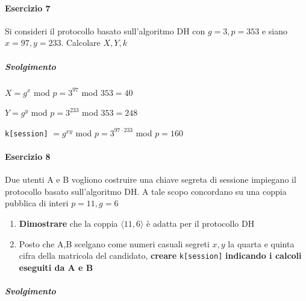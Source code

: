 \documentclass[10pt]{book}
\begin{document}
\paragraph{Esercizio 7} Si consideri il protocollo basato sull'algoritmo DH con $g=3, p=353$ e siano $x=97,y=233$. Calcolare $X,Y,k$
\subparagraph{Svolgimento}
\begin{list}{}{}
	\item $X = g^x$ mod $p = 3^{97}$ mod $353 = 40$
	\item $Y = g^y$ mod $p = 3^{233}$ mod $353 = 248$
	\item \texttt{k[session]} $= g^{xy}$ mod $p = 3^{97\cdot233}$ mod $p = 160$
\end{list}
\paragraph{Esercizio 8} Due utenti A e B vogliono costruire una chiave segreta di sessione impiegano il protocollo basato sull'algoritmo DH. A tale scopo concordano su una coppia pubblica di interi $p=11,g=6$
\begin{enumerate}
	\item \textbf{Dimostrare} che la coppia $\langle11,6\rangle$ è adatta per il protocollo DH
	\item Posto che A,B scelgano come numeri casuali segreti $x,y$ la quarta e quinta cifra della matricola del candidato, \textbf{creare} \texttt{k[session]} \textbf{indicando i calcoli eseguiti da A e B}
\end{enumerate}
\subparagraph{Svolgimento}
\end{document}
